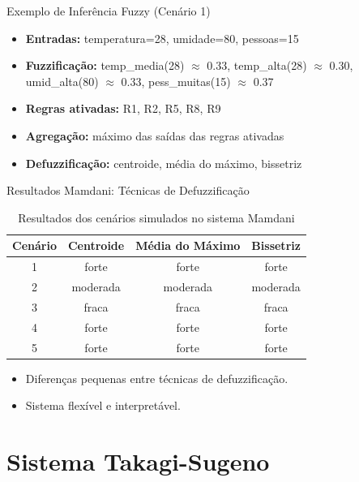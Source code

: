 \documentclass[aspectratio=169]{beamer}
\begin{document}
\begin{frame}{Exemplo de Inferência Fuzzy (Cenário 1)}
    \begin{itemize}
        \item \textbf{Entradas:} temperatura=28, umidade=80, pessoas=15
        \item \textbf{Fuzzificação:} temp\_media(28) \(\approx\) 0.33, temp\_alta(28) \(\approx\) 0.30, umid\_alta(80) \(\approx\) 0.33, pess\_muitas(15) \(\approx\) 0.37
        \item \textbf{Regras ativadas:} R1, R2, R5, R8, R9
        \item \textbf{Agregação:} máximo das saídas das regras ativadas
        \item \textbf{Defuzzificação:} centroide, média do máximo, bissetriz
    \end{itemize}
\end{frame}

\begin{frame}{Resultados Mamdani: Técnicas de Defuzzificação}
    \begin{table}
    \centering
    \caption{Resultados dos cenários simulados no sistema Mamdani}
    \begin{tabular}{@{}cccc@{}}
    \toprule
    Cenário & Centroide & Média do Máximo & Bissetriz \\
    \midrule
    1 & forte & forte & forte \\
    2 & moderada & moderada & moderada \\
    3 & fraca & fraca & fraca \\
    4 & forte & forte & forte \\
    5 & forte & forte & forte \\
    \bottomrule
    \end{tabular}
    \end{table}
    \vspace{0.5em}
    \begin{itemize}
        \item Diferenças pequenas entre técnicas de defuzzificação.
        \item Sistema flexível e interpretável.
    \end{itemize}
\end{frame}

\section{Sistema Takagi-Sugeno}
\end{document}
